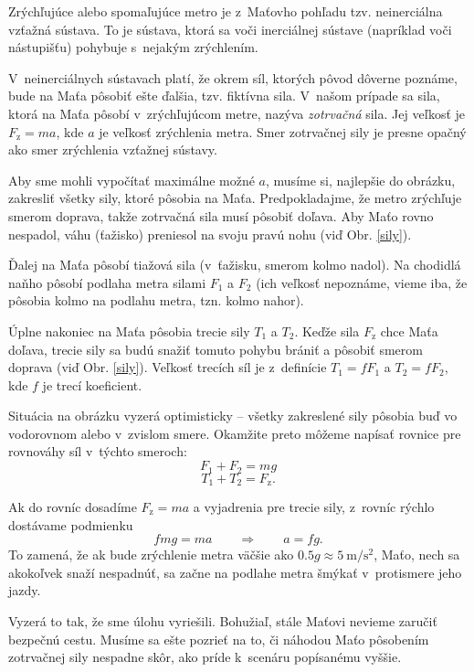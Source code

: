 Zrýchľujúce alebo spomaľujúce metro je z~Maťovho pohľadu tzv. neinerciálna
vzťažná sústava. To je sústava, ktorá sa voči inerciálnej sústave (napríklad
voči nástupišťu) pohybuje s~nejakým zrýchlením.

V~neinerciálnych sústavach platí, že okrem síl, ktorých pôvod dôverne poznáme,
bude na Maťa pôsobiť ešte ďalšia, tzv. fiktívna sila. V~našom prípade sa sila, ktorá
na Maťa pôsobí v~zrýchľujúcom metre, nazýva \emph{zotrvačná} sila. Jej veľkosť
je $F_{\mathrm{z}} = ma$, kde $a$ je veľkosť zrýchlenia metra. Smer zotrvačnej sily je
presne opačný ako smer zrýchlenia vzťažnej sústavy.

Aby sme mohli vypočítať maximálne možné $a$, musíme si, najlepšie do obrázku, zakresliť
všetky sily, ktoré pôsobia na Maťa. Predpokladajme, že metro zrýchľuje smerom
doprava, takže zotrvačná sila musí pôsobiť doľava. Aby Maťo rovno nespadol,
váhu (ťažisko) preniesol na svoju pravú nohu (viď Obr. \ref{sily}).

Ďalej na Maťa pôsobí tiažová sila (v~ťažisku, smerom kolmo
nadol). Na chodidlá naňho pôsobí podlaha metra silami $F_1$ a $F_2$ (ich veľkosť
nepoznáme, vieme iba, že pôsobia kolmo na podlahu metra, tzn. kolmo nahor).

Úplne nakoniec na Maťa pôsobia trecie sily $T_1$ a $T_2$. Keďže sila $F_{\mathrm{z}}$ chce
Maťa  doľava, trecie sily sa budú snažiť tomuto pohybu brániť a pôsobiť
smerom doprava (viď Obr. \ref{sily}). Veľkosť trecích síl je
z~definície $T_1 = f F_1$ a $T_2 = f F_2$, kde $f$ je trecí koeficient.

Situácia na obrázku vyzerá optimisticky -- všetky zakreslené sily pôsobia
buď vo vodorovnom alebo v~zvislom smere. Okamžite preto môžeme napísať
rovnice pre rovnováhy síl v~týchto smeroch:
$$F_1 + F_2 = mg$$
$$T_1 + T_2 = F_{\mathrm{z}}\text{.}$$

Ak do rovníc dosadíme $F_{\mathrm{z}} = ma$ a vyjadrenia pre trecie sily, z~rovníc
rýchlo dostávame podmienku
$$
  f mg = ma \qquad\Rightarrow\qquad a = fg \text{.}
$$
To zamená, že ak bude zrýchlenie metra väčšie ako $ 0.5g \approx \SI{5}{\meter\per\second\squared}$, Maťo,
nech sa akokoľvek snaží nespadnúť, sa začne na podlahe metra šmýkať v~protismere
jeho jazdy.

Vyzerá to tak, že sme úlohu vyriešili. Bohužiaľ, stále Maťovi nevieme zaručiť
bezpečnú cestu. Musíme sa ešte pozrieť na to, či náhodou Maťo pôsobením
zotrvačnej sily nespadne skôr, ako príde k~scenáru popísanému vyššie.

